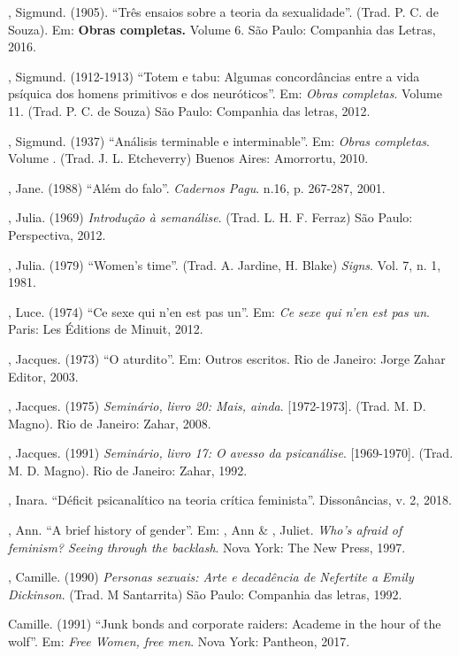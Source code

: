 , Sigmund. (1905). ``Três ensaios sobre a teoria da sexualidade''.
(Trad. P. C. de Souza). Em: \textbf{Obras completas.} Volume 6. São
Paulo: Companhia das Letras, 2016.

, Sigmund. (1912-1913) ``Totem e tabu: Algumas concordâncias entre
a vida psíquica dos homens primitivos e dos neuróticos''. Em:
\emph{Obras completas}. Volume 11. (Trad. P. C. de Souza) São Paulo:
Companhia das letras, 2012.

, Sigmund. (1937) ``Análisis terminable e interminable''. Em:
\emph{Obras completas}. Volume . (Trad. J. L. Etcheverry) Buenos
Aires: Amorrortu, 2010.

, Jane. (1988) ``Além do falo''. \emph{Cadernos Pagu}. n.16, p.
267-287, 2001.

, Julia. (1969) \emph{Introdução à semanálise}. (Trad. L. H. F.
Ferraz) São Paulo: Perspectiva, 2012.

, Julia. (1979) ``Women's time''. (Trad. A. Jardine, H. Blake)
\emph{Signs}. Vol. 7, n. 1, 1981.

, Luce. (1974) ``Ce sexe qui n'en est pas un''. Em: \emph{Ce
sexe qui n'en est pas un}. Paris: Les Éditions de Minuit, 2012.

, Jacques. (1973) ``O aturdito''. Em: Outros escritos. Rio de
Janeiro: Jorge Zahar Editor, 2003.

, Jacques. (1975) \emph{Seminário, livro 20: Mais, ainda}.
{[}1972-1973{]}. (Trad. M. D. Magno). Rio de Janeiro: Zahar, 2008.

, Jacques. (1991) \emph{Seminário, livro 17: O avesso da
psicanálise}. {[}1969-1970{]}. (Trad. M. D. Magno). Rio de Janeiro:
Zahar, 1992.

, Inara. ``Déficit psicanalítico na teoria crítica feminista''.
Dissonâncias, v. 2, 2018.

, Ann. ``A brief history of gender''. Em: , Ann \& ,
Juliet. \emph{Who's afraid of feminism? Seeing through the backlash}.
Nova York: The New Press, 1997.

, Camille. (1990) \emph{Personas sexuais: Arte e decadência de
Nefertite a Emily Dickinson}. (Trad. M Santarrita) São Paulo: Companhia
das letras, 1992.

 Camille. (1991) ``Junk bonds and corporate raiders: Academe in
the hour of the wolf''. Em: \emph{Free Women, free men}. Nova York:
Pantheon, 2017.

